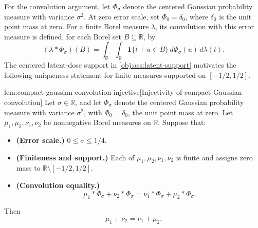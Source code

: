 \documentclass[11pt]{article}
\begin{document}
For the convolution argument, let \(\Phi_\sigma\) denote the centered Gaussian probability measure with variance \(\sigma^2\). At zero error scale, set \(\Phi_0=\delta_0\), where \(\delta_0\) is the unit point mass at zero. For a finite Borel measure \(\lambda\), its convolution with this error measure is defined, for each Borel set \(B\subseteq\mathbb R\), by
\[
(\lambda*\Phi_\sigma)(B)
=
\int_{\mathbb R}\int_{\mathbb R}
\mathbf 1\{t+u\in B\}\,d\Phi_\sigma(u)\,d\lambda(t).
\]
The centered latent-dose support in \cref{obj:ass:latent-support} motivates the following uniqueness statement for finite measures supported on \([-1/2,1/2]\).

\begin{lemmav}{lem:compact-gaussian-convolution-injective}[Injectivity of compact Gaussian convolution]
Let \(\sigma\in\mathbb R\), and let \(\Phi_\sigma\) denote the centered Gaussian probability measure with variance \(\sigma^2\), with \(\Phi_0=\delta_0\), the unit point mass at zero. Let \(\mu_1,\mu_2,\nu_1,\nu_2\) be nonnegative Borel measures on \(\mathbb R\). Suppose that:
\begin{itemize}
\item \textbf{(Error scale.)} \(0\le \sigma\le 1/4\).
\item \textbf{(Finiteness and support.)} Each of \(\mu_1,\mu_2,\nu_1,\nu_2\) is finite and assigns zero mass to \(\mathbb R\setminus[-1/2,1/2]\).
\item \textbf{(Convolution equality.)}
\[
\mu_1*\Phi_\sigma+\nu_2*\Phi_\sigma
=
\nu_1*\Phi_\sigma+\mu_2*\Phi_\sigma.
\]
\end{itemize}
Then
\[
\mu_1+\nu_2=\nu_1+\mu_2.
\]
\end{lemmav}
\end{document}
